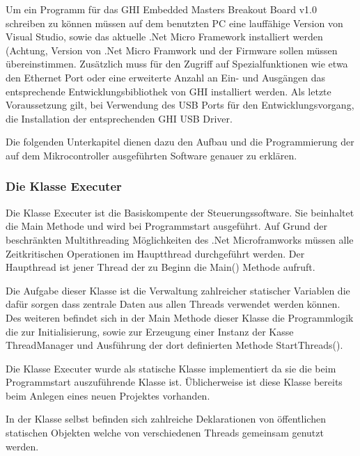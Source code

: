 Um ein Programm für das GHI Embedded Masters Breakout Board v1.0 schreiben zu können müssen auf dem benutzten PC eine lauffähige Version von Visual Studio, sowie das aktuelle .Net Micro Framework installiert werden (Achtung, Version von .Net Micro Framwork und der Firmware sollen müssen übereinstimmen. Zusätzlich muss für den Zugriff auf Spezialfunktionen wie etwa den Ethernet Port oder eine erweiterte Anzahl an Ein- und Ausgängen das entsprechende Entwicklungsbibliothek von GHI installiert werden. Als letzte Voraussetzung gilt, bei Verwendung des USB Ports für den Entwicklungsvorgang, die Installation der entsprechenden GHI USB Driver.  

Die folgenden Unterkapitel dienen dazu den Aufbau und die Programmierung der auf dem Mikrocontroller ausgeführten Software genauer zu erklären.

\subsubsection{Die Klasse Executer}
Die Klasse Executer ist die Basiskompente der Steuerungssoftware. Sie beinhaltet die Main Methode und wird bei Programmstart ausgeführt.
Auf Grund der beschränkten Multithreading Möglichkeiten des .Net Microframworks müssen alle Zeitkritischen Operationen im Hauptthread durchgeführt werden. Der Haupthread ist jener Thread der zu Beginn die Main() Methode aufruft.

Die Aufgabe dieser Klasse ist die Verwaltung zahlreicher statischer Variablen die dafür sorgen dass zentrale Daten aus allen Threads verwendet werden können.
Des weiteren befindet sich in der Main Methode dieser Klasse die Programmlogik die zur Initialisierung, sowie zur Erzeugung einer Instanz der Kasse ThreadManager und Ausführung der dort definierten Methode StartThreads().

Die Klasse Executer wurde als statische Klasse implementiert da sie die beim Programmstart auszuführende Klasse ist. Üblicherweise ist diese Klasse bereits beim Anlegen eines neuen Projektes vorhanden.

In der Klasse selbst befinden sich zahlreiche Deklarationen von öffentlichen statischen Objekten welche von verschiedenen Threads gemeinsam genutzt werden.

